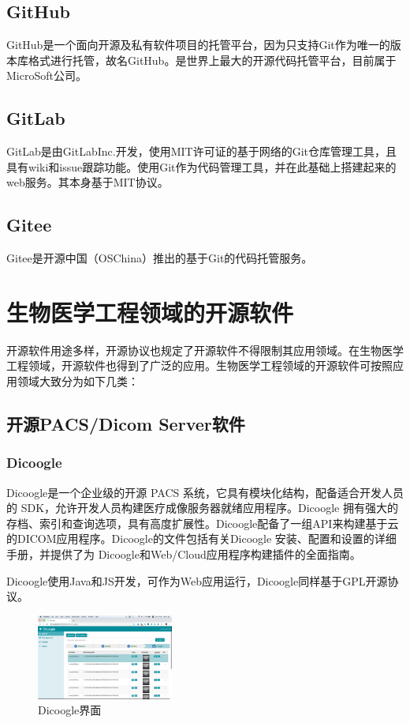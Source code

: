 \documentclass[UTF8]{ctexart}
\begin{document}
\subsection{GitHub}
GitHub是一个面向开源及私有软件项目的托管平台，因为只支持Git作为唯一的版本库格式进行托管，故名GitHub。是世界上最大的开源代码托管平台，目前属于MicroSoft公司。

\subsection{GitLab}
GitLab是由GitLabInc.开发，使用MIT许可证的基于网络的Git仓库管理工具，且具有wiki和issue跟踪功能。使用Git作为代码管理工具，并在此基础上搭建起来的web服务。其本身基于MIT协议。

\subsection{Gitee}
Gitee是开源中国（OSChina）推出的基于Git的代码托管服务。

\section{生物医学工程领域的开源软件}
开源软件用途多样，开源协议也规定了开源软件不得限制其应用领域。在生物医学工程领域，开源软件也得到了广泛的应用。生物医学工程领域的开源软件可按照应用领域大致分为如下几类：
\subsection{开源PACS/Dicom Server软件}
\subsubsection{Dicoogle}
Dicoogle是一个企业级的开源 PACS 系统，它具有模块化结构，配备适合开发人员的 SDK，允许开发人员构建医疗成像服务器就绪应用程序。Dicoogle 拥有强大的存档、索引和查询选项，具有高度扩展性。Dicoogle配备了一组API来构建基于云的DICOM应用程序。Dicoogle的文件包括有关Dicoogle 安装、配置和设置的详细手册，并提供了为 Dicoogle和Web/Cloud应用程序构建插件的全面指南。

Dicoogle使用Java和JS开发，可作为Web应用运行，Dicoogle同样基于GPL开源协议。

\begin{figure}[H]
    \centering
    \includegraphics[width=0.4\textwidth]{dicoogle.png}
    \caption{Dicoogle界面}
    \label{fig:Dicoogle}
\end{figure}
\end{document}
